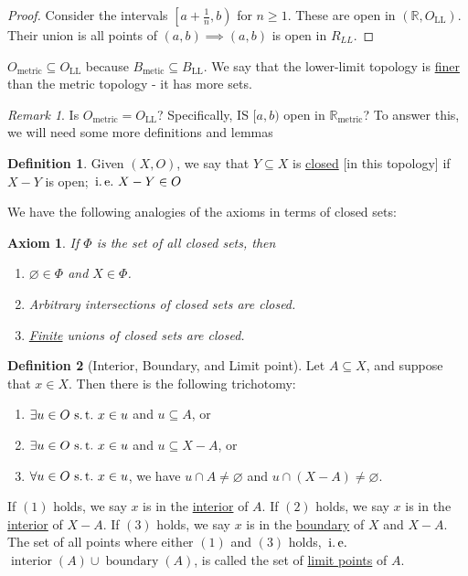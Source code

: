 \documentclass[12pt]{amsart}
\newcommand{\bbR}{\mathbb{R}}
\newcommand{\suchthat}{\operatorname{\thinspace s.t. \thinspace}}
\newcommand{\ie}{\operatorname{\thinspace i.e. \thinspace}}
\newcommand{\LL}{\operatorname{LL}}
\theoremstyle{plain}
\newtheorem*{axm}{Axiom}
\theoremstyle{remark}
\newtheorem*{rmk}{Remark}
\theoremstyle{definition}
\newtheorem*{define}{Definition}
\begin{document}
\begin{proof}
	Consider the intervals $\left[a + \displaystyle\frac{1}{n}, b\right)$ for $n \geqslant 1$. These are open in $(\bbR, O_{\LL})$. Their union is all points of $(a,b) \implies (a, b)$ is open in $R_{LL}$.
\end{proof}

\par
$O_{\text{metric}} \subseteq O_{\LL}$ because $B_{\text{metic}} \subseteq B_{\LL}$. We say that the lower-limit topology is \ul{finer} than the metric topology - it has more sets.
\begin{rmk}
	Is $O_{\text{metric}} = O_{\LL}$? Specifically, IS $[a, b)$ open in $\bbR_{\text{metric}}$?
	\newline
	To answer this, we will need some more definitions and lemmas 
\end{rmk}

\begin{define}
	Given $(X, O)$, we say that $Y \subseteq X$ is \ul{closed} [in this topology] if $X - Y$ is open; $\ie X - Y \in O$ 
\end{define}

We have the following analogies of the axioms in terms of closed sets: 

\begin{axm}
	If $\Phi$ is the set of all closed sets, then
	\begin{enumerate}[(1)]
		\item $\varnothing \in \Phi$ and $X \in \Phi$.
		\item Arbitrary intersections of closed sets are closed.
		\item \ul{Finite} unions of closed sets are closed.
	\end{enumerate}
\end{axm}

\begin{define}[Interior, Boundary, and Limit point]
Let $A \subseteq X$, and suppose that $x \in X$. Then there is the following trichotomy:
\begin{enumerate}[$(1)$]
	\item $\exists u \in O \suchthat x \in u $ and $u \subseteq A$, or
	\item $\exists u \in O \suchthat x \in u $ and $u \subseteq X - A$, or
	\item $\forall u \in O \suchthat x \in u $, we have $u \cap A \neq \varnothing$ and $u \cap (X - A) \neq \varnothing$.
\end{enumerate}
If $(1)$ holds, we say $x$ is in the \ul{interior} of $A$.
\newline
If $(2)$ holds, we say $x$ is in the \ul{interior} of $X - A$.
\newline
If $(3)$ holds, we say $x$ is in the \ul{boundary} of $X$ and $X - A$.
\newline
The set of all points where either $(1)$ and $(3)$ holds, $\ie$ $\operatorname{interior}(A) \cup \operatorname{boundary}(A)$, is called the set of \ul{limit points} of $A$.
\end{define}
\end{document}
